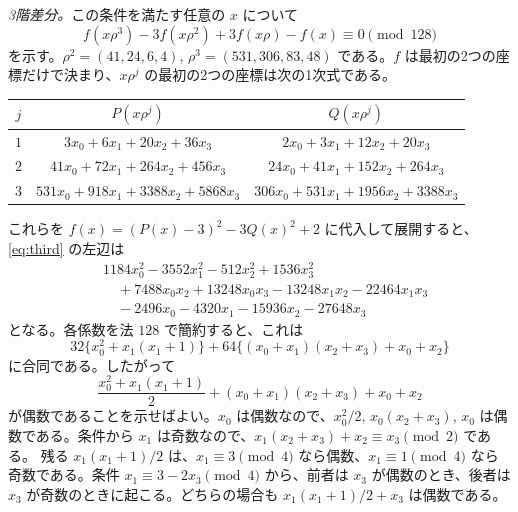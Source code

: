 \documentclass[a4paper,11pt]{ltjsarticle}
\theoremstyle{jplain}
\numberwithin{equation}{section}
\numberwithin{table}{section}
\begin{document}
\emph{3階差分。}この条件を満たす任意の $x$ について
\begin{equation}\label{eq:third}
f(x\rho^3)-3f(x\rho^2)+3f(x\rho)-f(x)\equiv0\pmod{128}
\end{equation}
を示す。$\rho^2=(41,24,6,4)$, $\rho^3=(531,306,83,48)$ である。$f$ は最初の2つの座標だけで決まり、$x\rho^j$ の最初の2つの座標は次の1次式である。
\begin{center}
\small
\begin{tabular}{ccc}
\toprule
$j$ & $P(x\rho^j)$ & $Q(x\rho^j)$\\
\midrule
$1$ & $3x_0+6x_1+20x_2+36x_3$ & $2x_0+3x_1+12x_2+20x_3$\\
$2$ & $41x_0+72x_1+264x_2+456x_3$ & $24x_0+41x_1+152x_2+264x_3$\\
$3$ & $531x_0+918x_1+3388x_2+5868x_3$ & $306x_0+531x_1+1956x_2+3388x_3$\\
\bottomrule
\end{tabular}
\end{center}
これらを $f(x)=(P(x)-3)^2-3Q(x)^2+2$ に代入して展開すると、\eqref{eq:third} の左辺は
\[
\begin{aligned}
&1184x_0^2-3552x_1^2-512x_2^2+1536x_3^2\\
&\quad+7488x_0x_2+13248x_0x_3-13248x_1x_2-22464x_1x_3\\
&\quad-2496x_0-4320x_1-15936x_2-27648x_3
\end{aligned}
\]
となる。各係数を法 $128$ で簡約すると、これは
\[
32\bigl\{x_0^2+x_1(x_1+1)\bigr\}+64\bigl\{(x_0+x_1)(x_2+x_3)+x_0+x_2\bigr\}
\]
に合同である。したがって
\[
\frac{x_0^2+x_1(x_1+1)}2+(x_0+x_1)(x_2+x_3)+x_0+x_2
\]
が偶数であることを示せばよい。$x_0$ は偶数なので、$x_0^2/2$, $x_0(x_2+x_3)$, $x_0$ は偶数である。条件から $x_1$ は奇数なので、$x_1(x_2+x_3)+x_2\equiv x_3\pmod2$ である。
残る $x_1(x_1+1)/2$ は、$x_1\equiv3\pmod4$ なら偶数、$x_1\equiv1\pmod4$ なら奇数である。条件 $x_1\equiv3-2x_3\pmod4$ から、前者は $x_3$ が偶数のとき、後者は $x_3$ が奇数のときに起こる。どちらの場合も $x_1(x_1+1)/2+x_3$ は偶数である。
\end{document}
